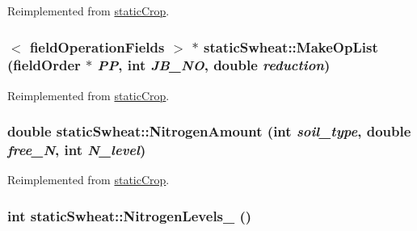 Reimplemented from \hyperlink{classstatic_crop_afe0cb8a7831afa941a37338f05227d67}{staticCrop}.\hypertarget{classstatic_swheat_abfbd2f77fd397b2f07e9455af578c1fc}{
\subsubsection[{MakeOpList}]{$<$ {\bf fieldOperationFields} $>$ $\ast$ staticSwheat::MakeOpList ({\bf fieldOrder} $\ast$ {\em PP}, \/  int {\em JB\_\-NO}, \/  double {\em reduction})}}
\label{classstatic_swheat_abfbd2f77fd397b2f07e9455af578c1fc}


Reimplemented from \hyperlink{classstatic_crop_a9b67ef1ae531a3afb32b63a4aeb5916b}{staticCrop}.\hypertarget{classstatic_swheat_aacbf9a07881d316f9d3313e611be6b0a}{
\subsubsection[{NitrogenAmount}]{\setlength{\rightskip}{0pt plus 5cm}double staticSwheat::NitrogenAmount (int {\em soil\_\-type}, \/  double {\em free\_\-N}, \/  int {\em N\_\-level})}}
\label{classstatic_swheat_aacbf9a07881d316f9d3313e611be6b0a}


Reimplemented from \hyperlink{classstatic_crop_af3aa85321a8a75406f8a0751b71587d0}{staticCrop}.\hypertarget{classstatic_swheat_aed632f688474e1cf25a80080783fda87}{
\subsubsection[{NitrogenLevels\_\-}]{\setlength{\rightskip}{0pt plus 5cm}int staticSwheat::NitrogenLevels\_\- ()}}
\label{classstatic_swheat_aed632f688474e1cf25a80080783fda87}


